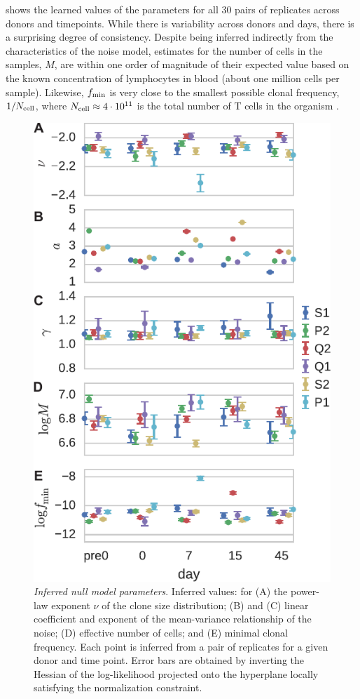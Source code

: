 \documentclass[pre,twocolumn,english,longbibliography]{revtex4}
\newcommand{\<}{\langle}
\renewcommand{\>}{\rangle}
\begin{document}
 shows the learned values of the parameters for all 30 pairs of replicates across donors and timepoints.
While there is variability across donors and days, there is a surprising degree of consistency. Despite being inferred indirectly from the characteristics of the noise model, estimates for the number of cells in the samples, $M$, are within one order of magnitude of their expected value based on the known concentration of lymphocytes in blood (about one million cells per sample). Likewise, $f_{\rm min}$ is very close to the smallest possible clonal frequency, $1/N_{\rm cell}$, where $N_{\rm cell}\approx 4\cdot 10^{11}$  is the total number of T cells in the organism \cite{Jenkins2010}.

\begin{figure}
\includegraphics[width=.8\linewidth]{fig3_learnednullparas}
\centering{}
\caption{
  \emph{Inferred null model parameters}. Inferred values: for (A) the power-law exponent $\nu$ of the clone size distribution; (B) and (C) linear coefficient and exponent of the mean-variance relationship of the noise; (D) effective number of cells; and (E) minimal clonal frequency.
  Each point is inferred from a pair of replicates for a given donor and time point. Error bars are obtained by inverting the Hessian of the log-likelihood projected onto the hyperplane locally satisfying the normalization constraint.
\label{fig:nullparas_timeseries}}
\end{figure}
\end{document}
